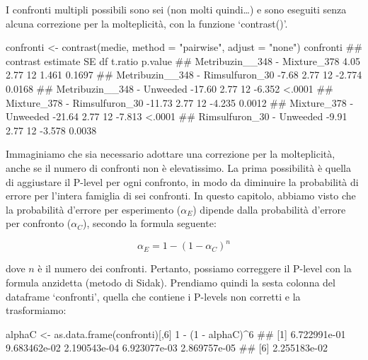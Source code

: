 \documentclass[a4paper,12pt,oneside]{book}
\newenvironment{Shaded}{}{}
\newcommand{\KeywordTok}[1]{#1}
\newcommand{\DataTypeTok}[1]{#1}
\newcommand{\DecValTok}[1]{#1}
\newcommand{\StringTok}[1]{#1}
\newcommand{\CommentTok}[1]{#1}
\newcommand{\OperatorTok}[1]{#1}
\newcommand{\NormalTok}[1]{#1}
\begin{document}
I confronti multipli possibili sono sei (non molti quindi\ldots{}) e sono eseguiti senza alcuna correzione per la molteplicità, con la funzione `contrast()'.

\scriptsize

\begin{Shaded}
\begin{Highlighting}[]
\NormalTok{confronti <-}\StringTok{ }\KeywordTok{contrast}\NormalTok{(medie, }\DataTypeTok{method =} \StringTok{"pairwise"}\NormalTok{, }
                      \DataTypeTok{adjust =} \StringTok{"none"}\NormalTok{)}
\NormalTok{confronti}
\CommentTok{##  contrast                         estimate   SE df t.ratio p.value}
\CommentTok{##  Metribuzin__348 - Mixture_378        4.05 2.77 12  1.461  0.1697 }
\CommentTok{##  Metribuzin__348 - Rimsulfuron_30    -7.68 2.77 12 -2.774  0.0168 }
\CommentTok{##  Metribuzin__348 - Unweeded         -17.60 2.77 12 -6.352  <.0001 }
\CommentTok{##  Mixture_378 - Rimsulfuron_30       -11.73 2.77 12 -4.235  0.0012 }
\CommentTok{##  Mixture_378 - Unweeded             -21.64 2.77 12 -7.813  <.0001 }
\CommentTok{##  Rimsulfuron_30 - Unweeded           -9.91 2.77 12 -3.578  0.0038}
\end{Highlighting}
\end{Shaded}

\normalsize

Immaginiamo che sia necessario adottare una correzione per la molteplicità, anche se il numero di confronti non è elevatissimo. La prima possibilità è quella di aggiustare il P-level per ogni confronto, in modo da diminuire la probabilità di errore per l'intera famiglia di sei confronti. In questo capitolo, abbiamo visto che la probabilità d'errore per esperimento (\(\alpha_E\)) dipende dalla probabilità d'errore per confronto (\(\alpha_C\)), secondo la formula seguente:

\[\alpha_E = 1 - (1 - \alpha_C)^n\]

dove \(n\) è il numero dei confronti. Pertanto, possiamo correggere il P-level con la formula anzidetta (metodo di Sidak). Prendiamo quindi la sesta colonna del dataframe `confronti', quella che contiene i P-levels non corretti e la trasformiamo:

\begin{Shaded}
\begin{Highlighting}[]
\NormalTok{alphaC <-}\StringTok{ }\KeywordTok{as.data.frame}\NormalTok{(confronti)[,}\DecValTok{6}\NormalTok{]}
\DecValTok{1} \OperatorTok{-}\StringTok{ }\NormalTok{(}\DecValTok{1} \OperatorTok{-}\StringTok{ }\NormalTok{alphaC)}\OperatorTok{^}\DecValTok{6}
\CommentTok{## [1] 6.722991e-01 9.683462e-02 2.190543e-04 6.923077e-03 2.869757e-05}
\CommentTok{## [6] 2.255183e-02}
\end{Highlighting}
\end{Shaded}
\end{document}
